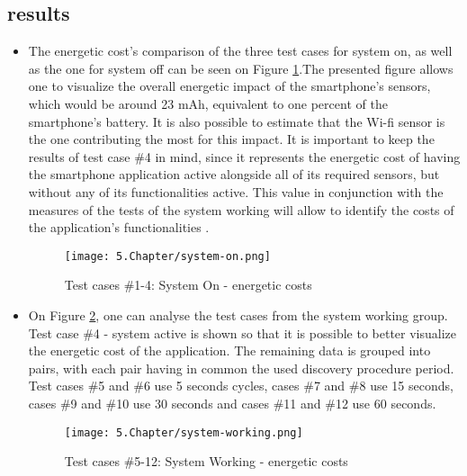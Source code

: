   
  
  
\subsection{results}  
\label{subsec:results}  
  
  
\begin{itemize}  
  
\item The energetic cost's comparison of the three test cases for system on, as well as the one for system off can be seen on Figure \ref{fig:syson}.The presented figure allows one to visualize the overall energetic impact of the smartphone's sensors, which would be around 23 mAh, equivalent to one percent of the smartphone's battery. It is also possible to estimate that the Wi-fi sensor is the one contributing the most for this impact.   
It is important to keep the results of test case \#4 in mind, since it represents the energetic cost of having the smartphone application active alongside all of its required sensors, but without any of its functionalities active. This value in conjunction with the measures of the tests of the system working will allow to identify the costs of the application's functionalities .  
 
 
\begin{figure} [H] 
\centering  
\texttt{[image: 5.Chapter/system-on.png]}  
\caption[Test cases \#1-4: System On - energetic costs]{Test cases \#1-4: System On - energetic costs}  
\label{fig:syson}  
\end{figure}   
  
 
 
  
  
\item On Figure \ref{fig:syswork}, one can analyse the test cases from the system working group. Test case \#4 - system active is shown so that it is possible to better visualize the energetic cost of the application. The remaining data is grouped into pairs, with each pair having in common the used discovery procedure period. Test cases \#5 and \#6 use 5 seconds cycles, cases \#7 and \#8 use 15 seconds, cases \#9 and \#10 use 30 seconds and cases \#11 and \#12 use 60 seconds.  
  
\begin{figure}[H] 
\centering  
\texttt{[image: 5.Chapter/system-working.png]}  
\caption[Test cases \#5-12: System Working - energetic costs]{Test cases \#5-12: System Working - energetic costs}  
\label{fig:syswork}  
\end{figure}  
  

\end{itemize}
